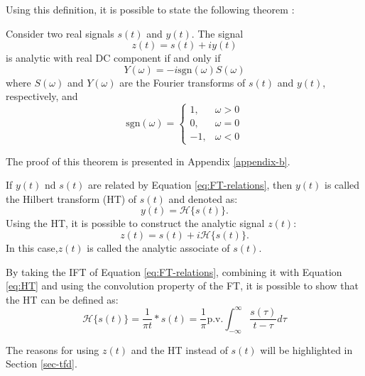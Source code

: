 Using this definition, it is possible to state the following theorem \cite{Boashash2016Chapter1TimeFrequency}:
\begin{theorem}
    Consider two real signals $s(t)$ and $y(t)$. The signal
    \begin{equation}
        z(t) = s(t) + iy(t)
        \label{eq:analytic-conjugate}
    \end{equation}
    is analytic with real DC component if and only if
    \begin{equation}
        Y(\omega) = -i \text{sgn}(\omega) S(\omega)
        \label{eq:FT-relations}
    \end{equation}
    where $S(\omega)$ and $Y(\omega)$ are the Fourier transforms of $s(t)$ and $y(t)$, respectively, and 
    \begin{equation}
        \text{sgn}(\omega) = \begin{cases}
            1, & \omega > 0 \\
            0, & \omega = 0 \\
            -1, & \omega < 0
        \end{cases}
    \end{equation}
\end{theorem}

The proof of this theorem is presented in Appendix \ref{appendix-b}.

If $y(t)$ nd $s(t)$ are related by Equation \ref{eq:FT-relations}, then $y(t)$ is called the Hilbert transform (HT) of $s(t)$ and denoted as:
\begin{equation}
    y(t) = \mathcal{H}\{s(t)\}.
    \label{eq:HT}
\end{equation}
\noindent Using the HT, it is possible to construct the analytic signal $z(t)$:
\begin{equation}
    z(t) = s(t) + i\mathcal{H}\{s(t)\}.
\end{equation}
\noindent In this case,$z(t)$ is called the analytic associate of $s(t)$. 

By taking the IFT of Equation \ref{eq:FT-relations}, combining it with Equation \ref{eq:HT} and using the convolution property of the FT, it is possible to show that the HT can be defined as:
\begin{equation}
    \mathcal{H}\{s(t)\} = \frac{1}{\pi t} * s(t) 
    = \frac{1}{\pi} \text{p.v.} \int_{-\infty}^{\infty} \frac{s(\tau)}{t-\tau} d\tau
    \label{eq:HT-definition}
\end{equation} 

The reasons for using $z(t)$ and the HT instead of $s(t)$ will be highlighted in Section \ref{sec-tfd}.

